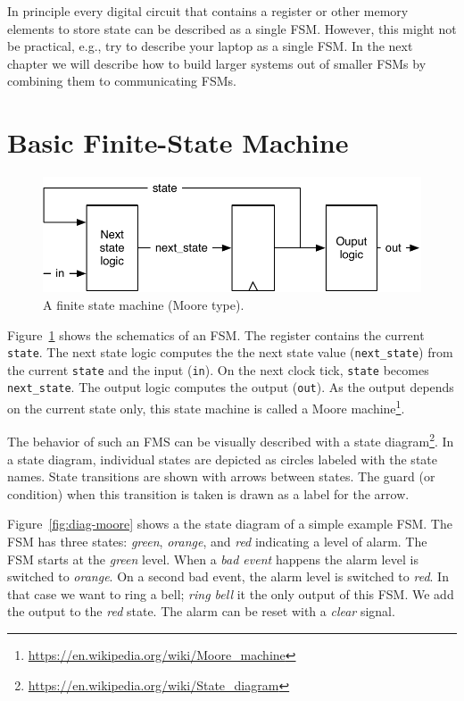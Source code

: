\documentclass[%
    10pt,
    headinclude, footexclude,
    openright, %
    notitlepage,
    cleardoubleempty,
    headsepline,
    pointlessnumbers,
    bibtotoc, idxtotoc,
    ]{scrbook}
\newcommand{\code}[1]{{\small{\texttt{#1}}}}
\newcommand{\scale}{0.7}
\newcommand{\myref}[2]{\href{#1}{#2}}
\renewcommand{\myref}[2]{{#2}{\footnote{\url{#1}}}}
\begin{document}
In principle every digital circuit that contains a register or other memory elements
to store state can be described as a single FSM. However, this might
not be practical, e.g., try to describe your laptop as a single FSM.
In the next chapter we will describe how to build larger systems
out of smaller FSMs by combining them to communicating FSMs.

\section{Basic Finite-State Machine}

\begin{figure}
  \centering
  \includegraphics[scale=\scale]{figures/fsm}
  \caption{A finite state machine (Moore type).}
  \label{fig:fsm}
\end{figure}

Figure~\ref{fig:fsm} shows the schematics of an FSM. The register contains the current \code{state}.
The next state logic computes the the next state value (\code{next\_state})
from the current \code{state} and the input (\code{in}).
On the next clock tick, \code{state} becomes \code{next\_state}.
The output logic computes the output (\code{out}). As the output depends on the current
state only, this state machine is called a
\myref{https://en.wikipedia.org/wiki/Moore_machine}{Moore machine}.


The behavior of such an FMS can be visually described with a
\myref{https://en.wikipedia.org/wiki/State_diagram}{state diagram}.
In a state diagram, individual states are depicted as circles labeled
with the state names.
State transitions are shown with arrows between states.
The guard (or condition) when this transition is taken is drawn as a label
for the arrow.

Figure~\ref{fig:diag-moore} shows a the state diagram of a simple example FSM.
The FSM has three states: \emph{green}, \emph{orange}, and \emph{red}
indicating a level of alarm. The FSM starts at the \emph{green} level.
When a \emph{bad event} happens the alarm level is switched to \emph{orange}.
On a second bad event, the alarm level is switched to \emph{red}.
In that case we want to ring a bell; \emph{ring bell} it the only output of this FSM.
We add the output to the \emph{red} state.
The alarm can be reset with a \emph{clear} signal.
\end{document}
